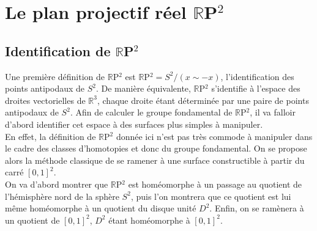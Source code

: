 \section{Le plan projectif réel $\mathbb{R}$P$^2$}
\subsection{Identification de $\mathbb{R}$P$^2$}
Une première définition de $\mathbb{R}$P$^2$ est $\mathbb{R}$P$^2=S^2/(x\sim-x)$, l'identification des points antipodaux de $S^2$. De manière équivalente, $\mathbb{R}$P$^2$ s'identifie à l'espace des droites vectorielles de $\mathbb{R}^3$, chaque droite étant déterminée par une paire de points antipodaux de $S^2$. Afin de calculer le groupe fondamental de $\mathbb{R}$P$^2$, il va falloir d'abord identifier cet espace à des surfaces plus simples à manipuler.\medskip\\
En effet, la définition de $\mathbb{R}$P$^2$ donnée ici n'est pas très commode à manipuler dans le cadre des classes d'homotopies et donc du groupe fondamental. On se propose alors la méthode classique de se ramener à une surface constructible à partir du carré $[0,1]^2$.\medskip\\
On va d'abord montrer que $\mathbb{R}$P$^2$ est homéomorphe à un passage au quotient de l'hémisphère nord de la sphère $S^2$, puis l'on montrera que ce quotient est lui même homéomorphe à un quotient du disque unité $D^2$. Enfin, on se ramènera à un quotient de $[0,1]^2$, $D^2$ étant homéomorphe à $[0,1]^2$. 
